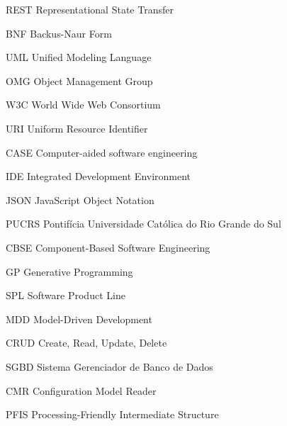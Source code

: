 \documentclass[
	12pt,				%
	openright,			%
	oneside,			%
	a4paper,			%
	english,			%
	french,				%
	spanish,			%
	brazil,				%
	]{abntex2}
\begin{document}

\frenchspacing


\imprimircapa

\imprimirfolhaderosto


\listoffigures*
\cleardoublepage

\listoftables*
\cleardoublepage

\begin{siglas}
  \item[REST] Representational State Transfer
  \item[BNF] Backus-Naur Form
  \item[UML] Unified Modeling Language
  \item[OMG] Object Management Group
  \item[W3C] World Wide Web Consortium
  \item[URI] Uniform Resource Identifier
  \item[CASE] Computer-aided software engineering
  \item[IDE] Integrated Development Environment
  \item[JSON] JavaScript Object Notation
  \item[PUCRS] Pontifícia Universidade Católica do Rio Grande do Sul
  \item[CBSE] Component-Based Software Engineering
  \item[GP] Generative Programming
  \item[SPL] Software Product Line
  \item[MDD] Model-Driven Development
  \item[CRUD] Create, Read, Update, Delete
  \item[SGBD] Sistema Gerenciador de Banco de Dados
  \item[CMR] Configuration Model Reader
  \item[PFIS] Processing-Friendly Intermediate Structure
\end{siglas}
\end{document}
